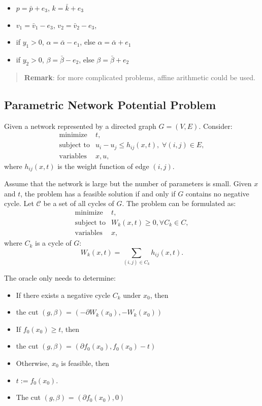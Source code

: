 \documentclass[final,leqno]{siamltex}
\providecommand{\tightlist}{%
  \setlength{\itemsep}{0pt}\setlength{\parskip}{0pt}}
\begin{document}
\begin{itemize}
\tightlist
\item
  \(p = \bar{p} + e_3\), \(k = \bar{k} + e_3\)
\item
  \(v_1 = \bar{v}_1 - e_3\), \(v_2 = \bar{v}_2 - e_3\),
\item
  if \(y_1 > 0\), \(\alpha = \bar{\alpha} - e_1\), else
  \(\alpha = \bar{\alpha} + e_1\)
\item
  if \(y_2 > 0\), \(\beta = \bar{\beta} - e_2\), else
  \(\beta = \bar{\beta} + e_2\)
\end{itemize}

\begin{quote}
\textbf{Remark}: for more complicated problems, affine arithmetic could be
used.
\end{quote}

\hypertarget{sec:parametric-network-potential-problem}{%
\subsection{Parametric Network Potential Problem}\label{sec:parametric-network-potential-problem}}

Given a network represented by a directed graph \(G = (V, E)\).
Consider:
\[\begin{array}{ll}
    \text{minimize} & t, \\
    \text{subject to} & u_i - u_j \le h_{ij}(x, t), \; \forall (i, j) \in E,\\
    \text{variables} &x, u,
  \end{array}
\]
where \(h_{ij}(x, t)\) is the weight function of edge \((i,j)\).

Assume that the network is large but the number of parameters is small.
Given \(x\) and \(t\), the problem has a feasible solution if and only if \(G\) contains no negative cycle.
Let \(\mathcal{C}\) be a set of all cycles of \(G\). The problem can be formulated as:
\[\begin{array}{ll}
    \text{minimize} & t, \\
    \text{subject to} & W_k(x, t) \ge 0, \forall C_k \in C ,\\
       \text{variables} & x,
\end{array}
\]
where \(C_k\) is a cycle of \(G\):
\[W_k(x, t) = \sum_{ (i,j)\in C_k} h_{ij}(x, t).
\]

The oracle only needs to determine:

\begin{itemize}
\tightlist
\item
  If there exists a negative cycle \(C_k\) under \(x_0\), then
\item
  the cut \((g, \beta)\) = \((-\partial W_k(x_0), -W_k(x_0))\)
\item
  If \(f_0(x_0) \ge t\), then
\item
  the cut \((g, \beta)\) = \((\partial f_0(x_0), f_0(x_0) - t)\)
\item
  Otherwise, \(x_0\) is feasible, then
\item
  \(t := f_0(x_0)\).
\item
  The cut \((g, \beta)\) = \((\partial f_0(x_0), 0)\)
\end{itemize}
\end{document}
